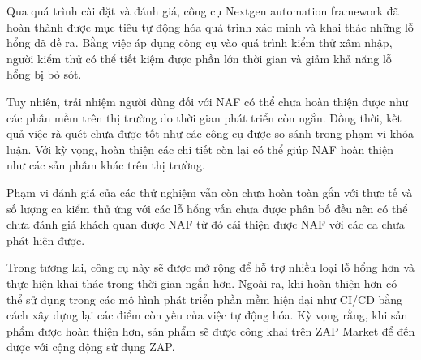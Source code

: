 \documentclass[./../main.tex]{subfiles}
\begin{document}
Qua quá trình cài đặt và đánh giá, công cụ Nextgen automation framework đã hoàn thành được mục tiêu tự động hóa quá trình xác minh và khai thác những lỗ hổng đã đề ra. Bằng việc áp dụng công cụ vào quá trình kiểm thử xâm nhập, người kiểm thử có thể tiết kiệm được phần lớn thời gian và giảm khả năng lỗ hổng bị bỏ sót.

Tuy nhiên, trải nhiệm người dùng đối với NAF có thể chưa hoàn thiện được như các phần mềm trên thị trường do thời gian phát triển còn ngắn. Đồng thời, kết quả việc rà quét chưa được tốt như các công cụ được so sánh trong phạm vi khóa luận. Với kỳ vọng, hoàn thiện các chi tiết còn lại có thể giúp NAF hoàn thiện như các sản phầm khác trên thị trường.

Phạm vi đánh giá của các thử nghiệm vẫn còn chưa hoàn toàn gắn với thực tế và số lượng ca kiểm thử ứng với các lỗ hổng vấn chưa được phân bố đều nên có thể chưa đánh giá khách quan được NAF từ đó cải thiện được NAF với các ca chưa phát hiện được.

Trong tương lai, công cụ này sẽ được mở rộng để hỗ trợ nhiều loại lỗ hổng hơn và thực hiện khai thác trong thời gian ngắn hơn. Ngoài ra, khi hoàn thiện hơn có thể sử dụng trong các mô hình phát triển phần mềm hiện đại như CI/CD bằng cách xây dựng lại các điểm còn yếu của việc tự động hóa. Kỳ vọng rằng, khi sản phẩm được hoàn thiện hơn, sản phẩm sẽ được công khai trên ZAP Market để đến được với cộng động sử dụng ZAP.
\end{document}
